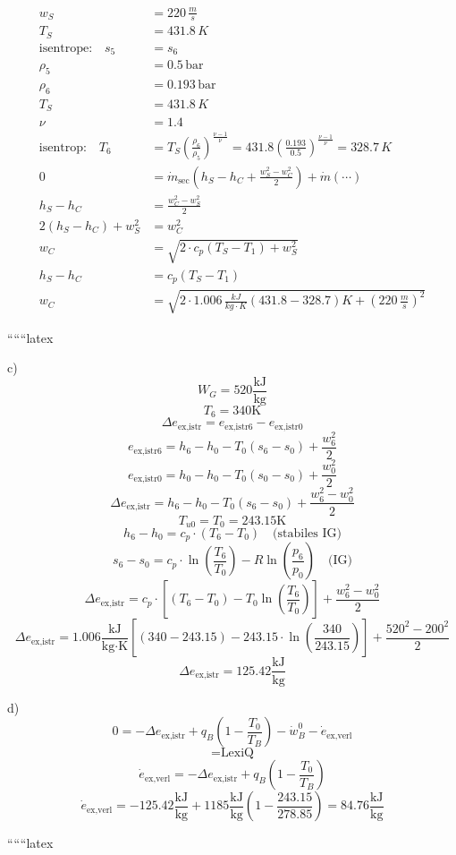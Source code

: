 \begin{align*}
    w_S &= 220 \, \frac{m}{s} \\
    T_S &= 431.8 \, K \\
    \text{isentrope:} \quad s_5 &= s_6 \\
    \rho_5 &= 0.5 \, \text{bar} \\
    \rho_6 &= 0.193 \, \text{bar} \\
    T_S &= 431.8 \, K \\
    \nu &= 1.4 \\
    \text{isentrop:} \quad T_6 &= T_S \left( \frac{\rho_6}{\rho_5} \right)^{\frac{\nu - 1}{\nu}} = 431.8 \left( \frac{0.193}{0.5} \right)^{\frac{\nu - 1}{\nu}} = 328.7 \, K \\
    0 &= \dot{m}_{\text{sec}} \left( h_S - h_C + \frac{w_S^2 - w_C^2}{2} \right) + \dot{m} \left( \cdots \right) \\
    h_S - h_C &= \frac{w_C^2 - w_S^2}{2} \\
    2 (h_S - h_C) + w_S^2 &= w_C^2 \\
    w_C &= \sqrt{2 \cdot c_p \left( T_S - T_1 \right) + w_S^2} \\
    h_S - h_C &= c_p \left( T_S - T_1 \right) \\
    w_C &= \sqrt{2 \cdot 1.006 \, \frac{kJ}{kg \cdot K} \left( 431.8 - 328.7 \right) K + (220 \, \frac{m}{s})^2}
\end{align*}

``````latex


c)
\[
W_G = 520 \frac{\text{kJ}}{\text{kg}}
\]
\[
T_6 = 340 \text{K}
\]
\[
\Delta e_{\text{ex,istr}} = e_{\text{ex,istr6}} - e_{\text{ex,istr0}}
\]
\[
e_{\text{ex,istr6}} = h_6 - h_0 - T_0 (s_6 - s_0) + \frac{w_6^2}{2}
\]
\[
e_{\text{ex,istr0}} = h_0 - h_0 - T_0 (s_0 - s_0) + \frac{w_0^2}{2}
\]
\[
\Delta e_{\text{ex,istr}} = h_6 - h_0 - T_0 (s_6 - s_0) + \frac{w_6^2 - w_0^2}{2}
\]
\[
T_{u0} = T_0 = 243.15 \text{K}
\]
\[
h_6 - h_0 = c_p \cdot (T_6 - T_0) \quad \text{(stabiles IG)}
\]
\[
s_6 - s_0 = c_p \cdot \ln \left( \frac{T_6}{T_0} \right) - R \ln \left( \frac{p_6}{p_0} \right) \quad \text{(IG)}
\]
\[
\Delta e_{\text{ex,istr}} = c_p \cdot \left[ (T_6 - T_0) - T_0 \ln \left( \frac{T_6}{T_0} \right) \right] + \frac{w_6^2 - w_0^2}{2}
\]
\[
\Delta e_{\text{ex,istr}} = 1.006 \frac{\text{kJ}}{\text{kg} \cdot \text{K}} \left[ (340 - 243.15) - 243.15 \cdot \ln \left( \frac{340}{243.15} \right) \right] + \frac{520^2 - 200^2}{2}
\]
\[
\Delta e_{\text{ex,istr}} = 125.42 \frac{\text{kJ}}{\text{kg}}
\]

d)
\[
0 = -\Delta e_{\text{ex,istr}} + q_B \left( 1 - \frac{T_0}{T_B} \right) - \dot{w}_B^0 - \dot{e}_{\text{ex,verl}}
\]
\[
= \text{LexiQ}
\]
\[
\dot{e}_{\text{ex,verl}} = -\Delta e_{\text{ex,istr}} + q_B \left( 1 - \frac{T_0}{T_B} \right)
\]
\[
\dot{e}_{\text{ex,verl}} = -125.42 \frac{\text{kJ}}{\text{kg}} + 1185 \frac{\text{kJ}}{\text{kg}} \left( 1 - \frac{243.15}{278.85} \right) = 84.76 \frac{\text{kJ}}{\text{kg}}
\]

``````latex


